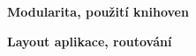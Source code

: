 





\begin{flushleft}
  \textbf{Modularita, použití knihoven}
\end{flushleft}

\begin{flushleft}
  \textbf{Layout aplikace, routování}
\end{flushleft}